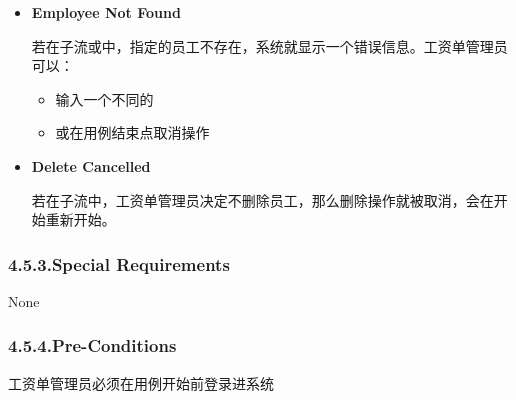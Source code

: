 \documentclass{article}
\begin{document}
\begin{itemize}%

\item{}
\textbf{Employee Not Found}%

若在子流或中，指定的员工不存在，系统就显示一个错误信息。工资单管理员可以：%

\begin{itemize}[noitemsep,topsep=\mdcompacttopsep]%

\item{}输入一个不同的%

\item{}或在用例结束点取消操作%
\end{itemize}%

\item{}
\textbf{Delete Cancelled}%

若在子流中，工资单管理员决定不删除员工，那么删除操作就被取消，会在开始重新开始。%
\end{itemize}%

\subsubsection{4.5.3.\hspace*{0.5em}Special Requirements}\label{sec-special-requirements}%

\noindent{}None%

\subsubsection{4.5.4.\hspace*{0.5em}Pre-Conditions}\label{sec-pre-conditions}%

\noindent{}工资单管理员必须在用例开始前登录进系统%
\end{document}
